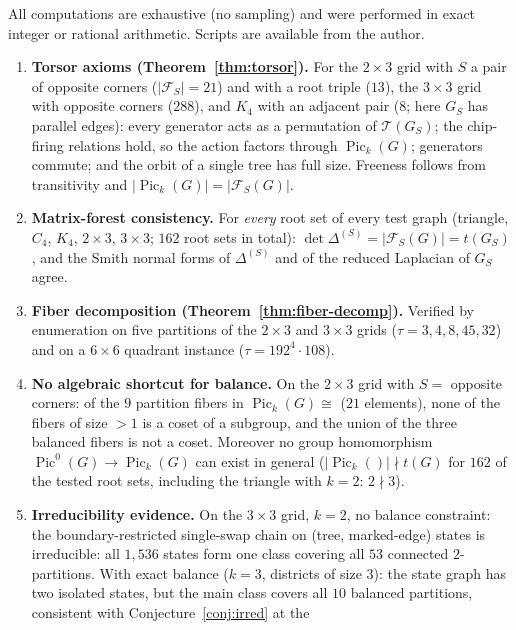 \documentclass[11pt]{article}
\newcommand{\PicO}[1]{\operatorname{Pic}^0(#1)}
\newcommand{\Pick}[1]{\operatorname{Pic}_k(#1)}
\newcommand{\Tcal}{\mathcal{T}}
\newcommand{\Fcal}{\mathcal{F}}
\begin{document}
All computations are exhaustive (no sampling) and were performed in exact
integer or rational arithmetic. Scripts are available from the author.

\begin{enumerate}[1.]
  \item \textbf{Torsor axioms (Theorem~\ref{thm:torsor}).} For the
    $2 \times 3$ grid with $S$ a pair of opposite corners ($|\Fcal_S| =
    21$) and with a root triple ($13$), the $3 \times 3$ grid with opposite
    corners ($288$), and $K_4$ with an adjacent pair ($8$; here $G_S$ has
    parallel edges): every generator acts as a permutation of
    $\Tcal(G_S)$; the chip-firing relations hold, so the action factors
    through $\Pick{G}$; generators commute; and the orbit of a single tree
    has full size. Freeness follows from transitivity and
    $|\Pick{G}| = |\Fcal_S(G)|$.
  \item \textbf{Matrix-forest consistency.} For \emph{every} root set of
    every test graph (triangle, $C_4$, $K_4$, $2\times 3$, $3 \times 3$;
    $162$ root sets in total): $\det \Delta^{(S)} = |\Fcal_S(G)| = t(G_S)$,
    and the Smith normal forms of $\Delta^{(S)}$ and of the reduced
    Laplacian of $G_S$ agree.
  \item \textbf{Fiber decomposition (Theorem~\ref{thm:fiber-decomp}).}
    Verified by enumeration on five partitions of the $2 \times 3$ and
    $3 \times 3$ grids ($\tau = 3, 4, 8, 45, 32$) and on a $6 \times 6$
    quadrant instance ($\tau = 192^4 \cdot 108$).
  \item \textbf{No algebraic shortcut for balance.} On the $2 \times 3$
    grid with $S = $ opposite corners: of the $9$ partition fibers in
    $\Pick{G} \cong$ ($21$ elements), none of the fibers of size $> 1$ is a
    coset of a subgroup, and the union of the three balanced fibers is not
    a coset. Moreover no group homomorphism $\PicO{G} \to \Pick{G}$ can
    exist in general ($|{\Pick{}}| \nmid t(G)$ for $162$ of the tested root
    sets, including the triangle with $k = 2$: $2 \nmid 3$).
  \item \textbf{Irreducibility evidence.} On the $3 \times 3$ grid,
    $k = 2$, no balance constraint: the boundary-restricted single-swap
    chain on (tree, marked-edge) states is irreducible: all $1{,}536$
    states form one class covering all $53$ connected $2$-partitions. With
    exact balance ($k = 3$, districts of size $3$): the state graph has two
    isolated states, but the main class covers all $10$ balanced
    partitions, consistent with Conjecture~\ref{conj:irred} at the

\end{enumerate}
\end{document}
